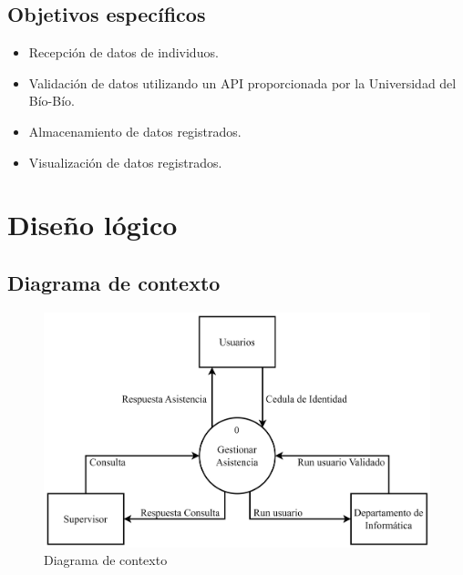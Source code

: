 \documentclass{templateReport}
\begin{document}
\subsection{Objetivos específicos}
\begin{itemize}
    \item Recepción de datos de individuos.
    \item Validación de datos utilizando un API proporcionada por la Universidad del Bío-Bío.
    \item Almacenamiento de datos registrados.
    \item Visualización de datos registrados.
\end{itemize}

\section{Diseño lógico}
\subsection{Diagrama de contexto}
\begin{figure}[H]
    \centering
    \includegraphics[scale=0.1]{img/TS-SI-Contexto.drawio.png}
    \caption{Diagrama de contexto}
    \label{fig:diagramaContexto}
\end{figure}
\end{document}
